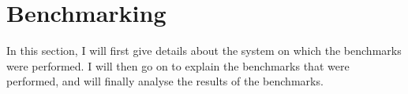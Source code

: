 \chapter{Benchmarking}
In this section, I will first give details about the system on which the benchmarks were performed.
I will then go on to explain the benchmarks that were performed, and will finally analyse the results of the benchmarks.







